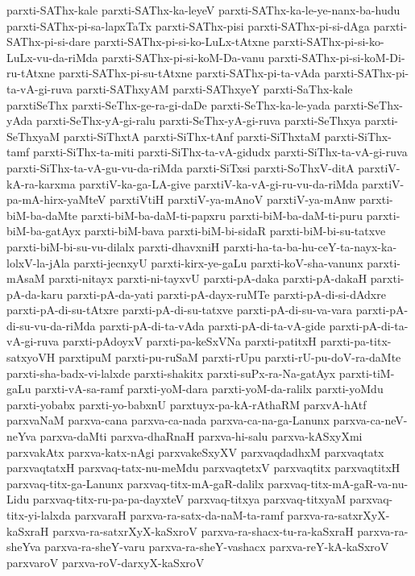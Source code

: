 {parxti-SAThx-kale
parxti-SAThx-ka-leyeV
parxti-SAThx-ka-le-ye-nanx-ba-hudu
parxti-SAThx-pi-sa-lapxTaTx
parxti-SAThx-pisi
parxti-SAThx-pi-si-dAga
parxti-SAThx-pi-si-dare
parxti-SAThx-pi-si-ko-LuLx-tAtxne
parxti-SAThx-pi-si-ko-LuLx-vu-da-riMda
parxti-SAThx-pi-si-koM-Da-vanu
parxti-SAThx-pi-si-koM-Di-ru-tAtxne
parxti-SAThx-pi-su-tAtxne
parxti-SAThx-pi-ta-vAda
parxti-SAThx-pi-ta-vA-gi-ruva
parxti-SAThxyAM
parxti-SAThxyeY
parxti-SaThx-kale
parxtiSeThx
parxti-SeThx-ge-ra-gi-daDe
parxti-SeThx-ka-le-yada
parxti-SeThx-yAda
parxti-SeThx-yA-gi-ralu
parxti-SeThx-yA-gi-ruva
parxti-SeThxya
parxti-SeThxyaM
parxti-SiThxtA
parxti-SiThx-tAnf
parxti-SiThxtaM
parxti-SiThx-tamf
parxti-SiThx-ta-miti
parxti-SiThx-ta-vA-gidudx
parxti-SiThx-ta-vA-gi-ruva
parxti-SiThx-ta-vA-gu-vu-da-riMda
parxti-SiTxsi
parxti-SoThxV-ditA
parxtiV-kA-ra-karxma
parxtiV-ka-ga-LA-give
parxtiV-ka-vA-gi-ru-vu-da-riMda
parxtiV-pa-mA-hirx-yaMteV
parxtiVtiH
parxtiV-ya-mAnoV
parxtiV-ya-mAnw
parxti-biM-ba-daMte
parxti-biM-ba-daM-ti-papxru
parxti-biM-ba-daM-ti-puru
parxti-biM-ba-gatAyx
parxti-biM-bava
parxti-biM-bi-sidaR
parxti-biM-bi-su-tatxve
parxti-biM-bi-su-vu-dilalx
parxti-dhavxniH
parxti-ha-ta-ba-hu-ceY-ta-nayx-ka-lolxV-la-jAla
parxti-jecnxyU
parxti-kirx-ye-gaLu
parxti-koV-sha-vanunx
parxti-mAsaM
parxti-nitayx
parxti-ni-tayxvU
parxti-pA-daka
parxti-pA-dakaH
parxti-pA-da-karu
parxti-pA-da-yati
parxti-pA-dayx-ruMTe
parxti-pA-di-si-dAdxre
parxti-pA-di-su-tAtxre
parxti-pA-di-su-tatxve
parxti-pA-di-su-va-vara
parxti-pA-di-su-vu-da-riMda
parxti-pA-di-ta-vAda
parxti-pA-di-ta-vA-gide
parxti-pA-di-ta-vA-gi-ruva
parxti-pAdoyxV
parxti-pa-keSxVNa
parxti-patitxH
parxti-pa-titx-satxyoVH
parxtipuM
parxti-pu-ruSaM
parxti-rUpu
parxti-rU-pu-doV-ra-daMte
parxti-sha-badx-vi-lalxde
parxti-shakitx
parxti-suPx-ra-Na-gatAyx
parxti-tiM-gaLu
parxti-vA-sa-ramf
parxti-yoM-dara
parxti-yoM-da-ralilx
parxti-yoMdu
parxti-yobabx
parxti-yo-babxnU
parxtuyx-pa-kA-rAthaRM
parxvA-hAtf
parxvaNaM
parxva-cana
parxva-ca-nada
parxva-ca-na-ga-Lanunx
parxva-ca-neV-neYva
parxva-daMti
parxva-dhaRnaH
parxva-hi-salu
parxva-kASxyXmi
parxvakAtx
parxva-katx-nAgi
parxvakeSxyXV
parxvaqdadhxM
parxvaqtatx
parxvaqtatxH
parxvaq-tatx-nu-meMdu
parxvaqtetxV
parxvaqtitx
parxvaqtitxH
parxvaq-titx-ga-Lanunx
parxvaq-titx-mA-gaR-dalilx
parxvaq-titx-mA-gaR-va-nu-Lidu
parxvaq-titx-ru-pa-pa-dayxteV
parxvaq-titxya
parxvaq-titxyaM
parxvaq-titx-yi-lalxda
parxvaraH
parxva-ra-satx-da-naM-ta-ramf
parxva-ra-satxrXyX-kaSxraH
parxva-ra-satxrXyX-kaSxroV
parxva-ra-shacx-tu-ra-kaSxraH
parxva-ra-sheYva
parxva-ra-sheY-varu
parxva-ra-sheY-vashacx
parxva-reY-kA-kaSxroV
parxvaroV
parxva-roV-darxyX-kaSxroV
}
